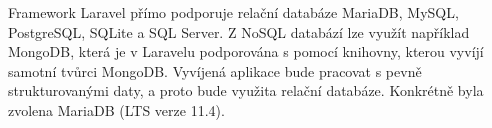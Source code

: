 Framework Laravel přímo podporuje relační databáze MariaDB, MySQL, PostgreSQL, SQLite a SQL Server. Z NoSQL databází lze využít například MongoDB, která je v Laravelu podporována s pomocí knihovny, kterou vyvíjí samotní tvůrci MongoDB. \cite{laravel-supported-databases} Vyvíjená aplikace bude pracovat s pevně strukturovanými daty, a proto bude využita relační databáze. Konkrétně byla zvolena MariaDB (LTS verze 11.4).
